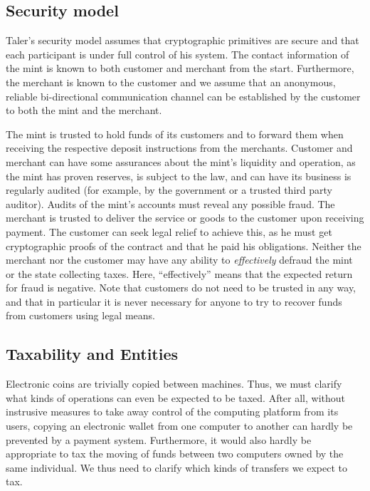\documentclass{llncs}
\begin{document}
\subsection{Security model}

Taler's security model assumes that cryptographic primitives are
secure and that each participant is under full control of his system.
The contact information of the mint is known to both customer and
merchant from the start.  Furthermore, the merchant is known to the
customer and we assume that an anonymous, reliable bi-directional
communication channel can be established by the customer to both the
mint and the merchant.

The mint is trusted to hold funds of its customers and to forward them
when receiving the respective deposit instructions from the merchants.
Customer and merchant can have some assurances about the mint's
liquidity and operation, as the mint has proven reserves, is subject
to the law, and can have its business is regularly audited (for
example, by the government or a trusted third party auditor).
Audits of the mint's accounts must reveal any possible fraud.
%
The merchant is trusted to deliver the service or goods to the
customer upon receiving payment.  The customer can seek legal relief
to achieve this, as he must get cryptographic proofs of the contract
and that he paid his obligations.
%
Neither the merchant nor the customer may have any ability to {\em
  effectively} defraud the mint or the state collecting taxes.  Here,
``effectively'' means that the expected return for fraud is negative.
%
Note that customers do not need to be trusted in any way, and that in
particular it is never necessary for anyone to try to recover funds
from customers using legal means.


\subsection{Taxability and Entities}

Electronic coins are trivially copied between machines.  Thus, we must
clarify what kinds of operations can even be expected to be taxed.
After all, without instrusive measures to take away control of the
computing platform from its users, copying an electronic wallet from
one computer to another can hardly be prevented by a payment system.
Furthermore, it would also hardly be appropriate to tax the moving of
funds between two computers owned by the same individual.  We thus
need to clarify which kinds of transfers we expect to tax.
\end{document}
